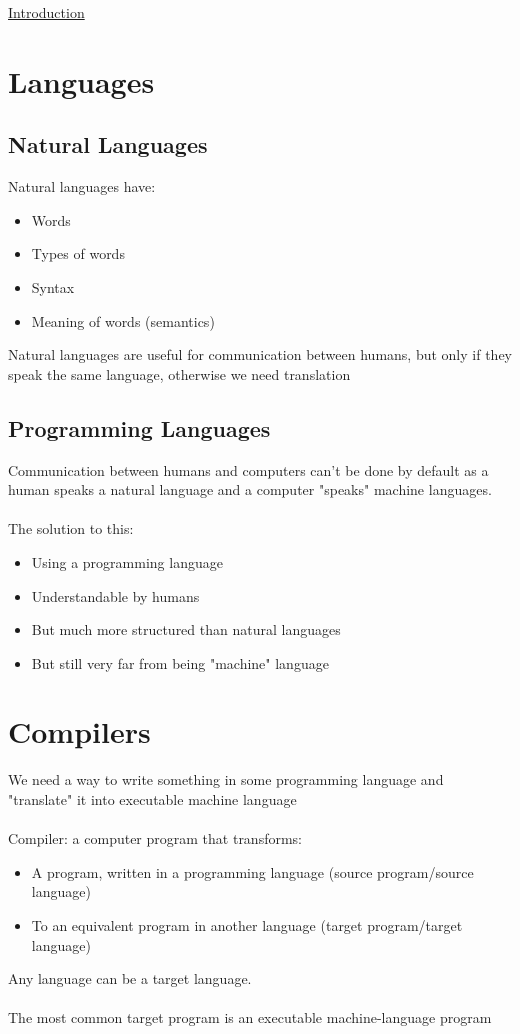 \documentclass{article}[18pt]
\begin{document}
\begin{center}
\underline{\huge Introduction}
\end{center}
\section{Languages}
\subsection{Natural Languages}
Natural languages have:
\begin{itemize}
	\item Words
	\item Types of words
	\item Syntax
	\item Meaning of words (semantics)
\end{itemize}
Natural languages are useful for communication between humans, but only if they speak the same language, otherwise we need translation
\subsection{Programming Languages}
Communication between humans and computers can't be done by default as a human speaks a natural language and a computer "speaks" machine languages.\\
\\
The solution to this:
\begin{itemize}
	\item Using a programming language
	\item Understandable by humans
	\item But much more structured than natural languages
	\item But still very far from being "machine" language
\end{itemize}
\section{Compilers}
We need a way to write something in some programming language and "translate" it into executable machine language\\
\\
Compiler: a computer program that transforms:
\begin{itemize}
	\item A program, written in a programming language (source program/source language)
	\item To an equivalent program in another language (target program/target language)
\end{itemize}
Any language can be a target language.\\
\\
The most common target program is an executable machine-language program
\end{document}
